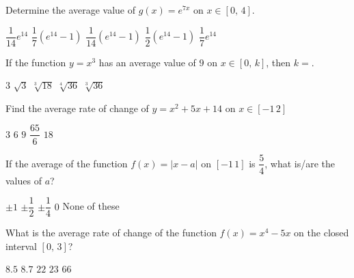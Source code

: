 \begin{questions}
    \question Determine the average value of $g(x) = e^{7x}$ on $x \in [0, \, 4]$. \\

    \begin{oneparchoices}
        \choice $\dfrac{1}{14}e^{14}$
        \choice $\dfrac{1}{7}\left(e^{14} - 1\right)$
        \choice $\dfrac{1}{14}\left(e^{14} - 1\right)$
        \choice $\dfrac{1}{2}\left(e^{14} - 1\right)$
        \choice $\dfrac{1}{7}e^{14}$
    \end{oneparchoices} \par \horizontalline

    \question If the function $y = x^3$ has an average value of $9$ on $x \in [0 , \, k]$, then $k = $. \\

    \begin{oneparchoices}
        \choice $3$
        \choice $\sqrt{3}$
        \choice $\sqrt[3]{18}$
        \choice $\sqrt[4]{36}$
        \choice $\sqrt[3]{36}$
    \end{oneparchoices} \par \horizontalline

    \question Find the average rate of change of $y = x^2 + 5x + 14$ on $x \in [-1 \, 2]$ \\
    
    \begin{oneparchoices}
        \choice $3$
        \choice $6$
        \choice $9$
        \choice $\dfrac{65}{6}$
        \choice $18$
    \end{oneparchoices} \par \horizontalline

    \question If the average of the function $f(x) = |x - a|$ on $[-1 \, 1]$ is $\dfrac{5}{4}$, what is/are the values of $a$? \\

    \begin{oneparchoices}
        \choice $\pm 1$
        \choice $\pm \dfrac{1}{2}$
        \choice $\pm \dfrac{1}{4}$
        \choice $0$
        \choice None of these
    \end{oneparchoices} \par \horizontalline

    \question What is the average rate of change of the function $f(x) = x^4 - 5x$ on the closed interval $[0, \, 3]$? \\

    \begin{oneparchoices}
        \choice $8.5$
        \choice $8.7$
        \choice $22$
        \choice $23$
        \choice $66$
    \end{oneparchoices} \par \horizontalline


\end{questions}
